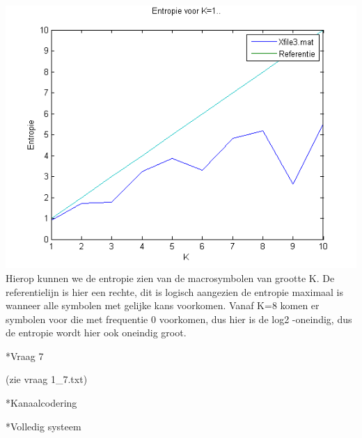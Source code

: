 \documentclass[]{article}
\begin{document}
\begin{section}
\begin{subsection}
        \includegraphics{vraag1_3.png}
		Hierop kunnen we de entropie zien van de macrosymbolen van grootte K. De referentielijn is hier een rechte, dit is logisch aangezien de entropie maximaal is wanneer alle symbolen met gelijke kans voorkomen.
		Vanaf K=8 komen er symbolen voor die met frequentie 0 voorkomen, dus hier is de log2 -oneindig, dus de entropie wordt hier ook oneindig groot.

    \end{subsection}

        \begin{subsection}*{Vraag 7}

        (zie vraag 1_7.txt)
    \end{subsection}
\end{section}
\begin{section}*{Kanaalcodering}
\end{section}
\begin{section}*{Volledig systeem}
\end{section}
\end{document}
